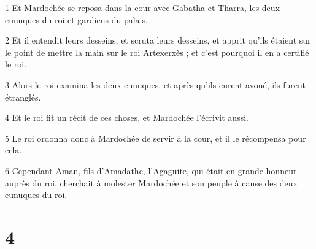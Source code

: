 \par 1 Et Mardochée se reposa dans la cour avec Gabatha et Tharra, les deux eunuques du roi et gardiens du palais.
\par 2 Et il entendit leurs desseins, et scruta leurs desseins, et apprit qu'ils étaient sur le point de mettre la main sur le roi Artexerxès ; et c'est pourquoi il en a certifié le roi.
\par 3 Alors le roi examina les deux eunuques, et après qu'ils eurent avoué, ils furent étranglés.
\par 4 Et le roi fit un récit de ces choses, et Mardochée l'écrivit aussi.
\par 5 Le roi ordonna donc à Mardochée de servir à la cour, et il le récompensa pour cela.
\par 6 Cependant Aman, fils d'Amadathe, l'Agaguite, qui était en grande honneur auprès du roi, cherchait à molester Mardochée et son peuple à cause des deux eunuques du roi.

\chapter{4}

